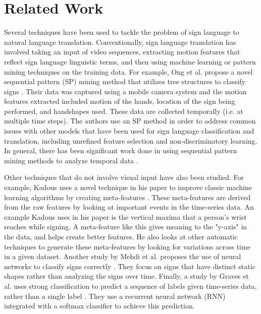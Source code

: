 \documentclass[twocolumn]{article}
\begin{document}
\section{Related Work}
Several techniques have been used to tackle the problem of sign language to natural language translation. Conventionally, sign language translation has involved taking an input of video sequences, extracting motion features that reflect sign language linguistic terms, and then using machine learning or pattern mining techniques on the training data. For example, Ong et al. propose a novel sequential pattern (SP) mining method that utilizes tree structures to classify signs \cite{ong2012sign}. Their data was captured using a mobile camera system and the motion features extracted included motion of the hands, location of the sign being performed, and handshapes used. These data are collected temporally (i.e. at multiple time steps). The authors use an SP method in order to address common issues with other models that have been used for sign language classification and translation, including unrefined feature selection and non-discriminatory learning. In general, there has been significant work done in using sequential pattern mining methods to analyze temporal data \cite{ong2012sign}\cite{papapetrou2007}.

Other techniques that do not involve visual input have also been studied. For example, Kadous uses a novel technique in his paper to improve classic machine learning algorithms by creating meta-features \cite{kadous2002temporal}. These meta-features are derived from the raw features by looking at important events in the time-series data. An example Kadous uses in his paper is the vertical maxima that a person's wrist reaches while signing. A meta-feature like this gives meaning to the "y-axis" in the data, and helps create better features. He also looks at other automatic techniques to generate these meta-features by looking for variations across time in a given dataset. Another study by Mehdi et al. proposes the use of neural networks to classify signs correctly \cite{mehdi2002sign}. They focus on signs that have distinct static shapes rather than analyzing the signs over time. Finally, a study by Graves et al. uses strong classification to predict a sequence of labels given time-series data, rather than a single label \cite{graves2006connectionist}. They use a recurrent neural network (RNN) integrated with a softmax classifier to achieve this prediction. 
\end{document}

